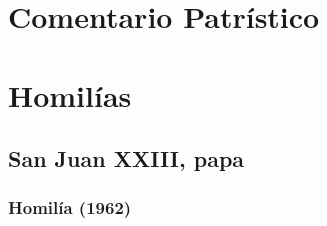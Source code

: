 \newsection				

\section{Comentario Patrístico}






\newsection			


\section{Homilías}
\homiliasNavidadABC

\subsection{San Juan XXIII, papa}

\subsubsection{Homilía (1962)}


